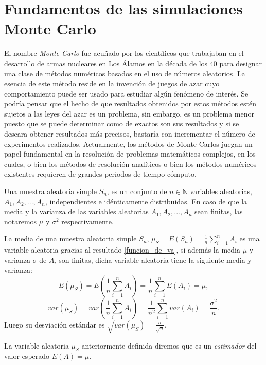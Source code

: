 \documentclass[../proyecto.tex]{memoir}
\begin{document}

\section{Fundamentos de las simulaciones Monte Carlo} \label{MonteCarlo}

El nombre \textit{Monte Carlo} fue acuñado por los científicos que trabajaban en el desarrollo de armas nucleares en Los Álamos en la década de los 40 para designar una clase de métodos numéricos basados en el uso de números aleatorios. La esencia de este método reside en la invención de juegos de azar cuyo comportamiento puede ser usado para estudiar algún fenómeno de interés. Se podría pensar que el hecho de que resultados obtenidos por estos métodos estén sujetos a las leyes del azar es un problema, sin embargo, es un problema menor puesto que se puede determinar como de exactos son sus resultados y si se deseara obtener resultados más precisos, bastaría con incrementar el número de experimentos realizados. Actualmente, los métodos de Monte Carlos juegan un papel fundamental en la resolución de problemas matemáticos complejos, en los cuales, o bien los métodos de resolución analíticos o bien los métodos numéricos existentes requieren de grandes periodos de tiempo cómputo.

\begin{defi}
Una muestra aleatoria simple $S_n$, es un conjunto de $n\in\mathds{N}$ variables aleatorias, $A_1,A_2,...,A_n$, independientes e idénticamente distribuidas. En caso de que la media y la varianza de las variables aleatorias $A_1,A_2,...,A_n$ sean finitas, las notaremos $\mu$ y $\sigma^2$ respectivamente.
\end{defi}

La media de una muestra aleatoria simple $S_n$, $\mu_S = E(S_n) = \frac{1}{n}\sum_{i=1}^n A_i$ es una variable aleatoria gracias al resultado \ref{funcion_de_va}, si además la media $\mu$ y varianza $\sigma$ de $A_i$ son finitas, dicha variable aleatoria tiene la siguiente media y varianza:$$
E(\mu_S) = E(\frac{1}{n}\sum_{i=1}^n A_i) = \frac{1}{n}\sum_{i=1}^n E(A_i) = \mu,
$$
$$
var(\mu_S) = var(\frac{1}{n}\sum_{i=1}^n A_i) = \frac{1}{n^2} \sum_{i=1}^n var(A_i) = \frac{\sigma^2}{n}.
$$
Luego su desviación estándar es $\sqrt{var(\mu_S)} = \frac{\sigma}{\sqrt{n}}$.
\begin{defi}
La variable aleatoria $\mu_S$ anteriormente definida diremos que es un \textit{estimador} del valor esperado $E(A)=\mu$.
\end{defi}
\end{document}
